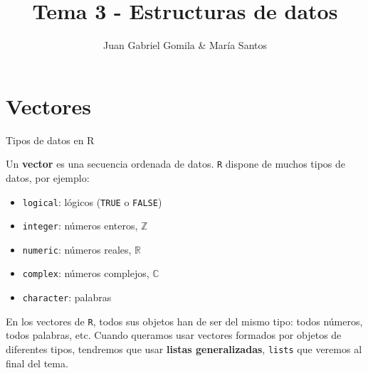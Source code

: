 \documentclass[
  ignorenonframetext,
]{beamer}
\title{Tema 3 - Estructuras de datos}
\author{Juan Gabriel Gomila \& María Santos}
\date{}
\providecommand{\tightlist}{%
  \setlength{\itemsep}{0pt}\setlength{\parskip}{0pt}}
\begin{document}
\frame{\titlepage}

\hypertarget{vectores}{%
\section{Vectores}\label{vectores}}

\begin{frame}[fragile]{Tipos de datos en R}
\protect\hypertarget{tipos-de-datos-en-r}{}

Un \textbf{vector} es una secuencia ordenada de datos. \texttt{R}
dispone de muchos tipos de datos, por ejemplo:

\begin{itemize}
\tightlist
\item
  \texttt{logical}: lógicos (\texttt{TRUE} o \texttt{FALSE})
\item
  \texttt{integer}: números enteros, \(\mathbb Z\)
\item
  \texttt{numeric}: números reales, \(\mathbb R\)
\item
  \texttt{complex}: números complejos, \(\mathbb C\)
\item
  \texttt{character}: palabras
\end{itemize}

En los vectores de \texttt{R}, todos sus objetos han de ser del mismo
tipo: todos números, todos palabras, etc. Cuando queramos usar vectores
formados por objetos de diferentes tipos, tendremos que usar
\textbf{listas generalizadas}, \texttt{lists} que veremos al final del
tema.

\end{frame}
\end{document}
